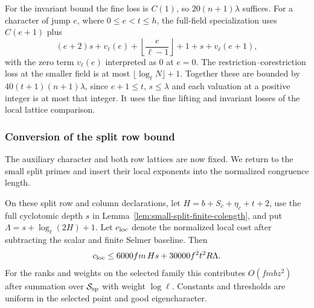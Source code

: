 For the invariant bound the fine loss is \(C(1)\),
so \(20(n+1)\lambda\) suffices. For a character of
jump \(e\), where \(0\le e<t\le h\), the full-field
specialization uses \(C(e+1)\) plus
\[
 (e+2)s+v_\ell(e)+\left\lfloor\frac{e}{\ell-1}\right\rfloor
       +1+s+v_\ell(e+1),
\]
with the zero term \(v_\ell(e)\) interpreted as \(0\) at
\(e=0\). The restriction--corestriction loss at the smaller
field is at most \(\lfloor\log_\ell N\rfloor+1\).
Together these are bounded by \(40(t+1)(n+1)\lambda\),
since \(e+1\le t\), \(s\le\lambda\) and each valuation
at a positive integer is at most that integer.
 It uses the
fine lifting and invariant losses of the local lattice
comparison. \label{cor:small-prime-lengths-3}



















\subsubsection*{Conversion of the split row bound}

The auxiliary character and both row lattices are now fixed. We return to the small split primes and insert their local exponents into the normalized congruence length.

\begin{proposition}\label{prop:small-split-loss}
On these split row and column declarations, let
\(H=b+S_c+\eta_c+t+2\), use the full cyclotomic depth \(s\) in Lemma~\ref{lem:small-split-finite-colength}, and
put \(\Lambda=s+\log_\ell(2H)+1\).
Let \(c_{\rm loc}\) denote the normalized local cost after subtracting the scalar and finite Selmer baseline. Then
\[
 c_{\rm loc}\le 6000 f m\,H s+30000 f^2t^2 R\Lambda.
\]
For the ranks and weights on the selected family this contributes
\(O(fmbz^2)\) after summation over \(\mathcal S_{\rm sp}\)
with weight \(\log\ell\). Constants and thresholds are uniform in
the selected point and good eigencharacter.
\end{proposition}

